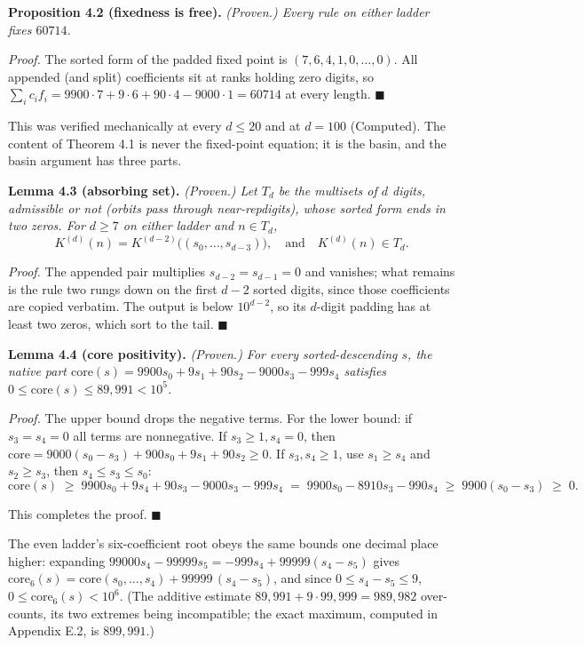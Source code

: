 \documentclass[11pt,letterpaper]{article}
\theoremstyle{paperstyle}
\theoremstyle{paperstyledef}
\theoremstyle{paperstylerem}
\begin{document}
\textbf{Proposition 4.2 (fixedness is free).} \emph{(Proven.) Every rule on either ladder fixes \(60714\).}

\emph{Proof.} The sorted form of the padded fixed point is \((7,6,4,1,0,\dots,0)\). All appended (and split) coefficients sit at ranks holding zero digits, so \(\sum_i c_i f_i = 9900\cdot 7 + 9 \cdot 6 + 90\cdot 4 - 9000 \cdot 1 = 60714\) at every length. \(\blacksquare\)

This was verified mechanically at every \(d \leq 20\) and at \(d = 100\) (Computed). The content of Theorem 4.1 is never the fixed-point equation; it is the basin, and the basin argument has three parts.

\textbf{Lemma 4.3 (absorbing set).} \emph{(Proven.) Let \(T_d\) be the multisets of \(d\) digits, admissible or not (orbits pass through near-repdigits), whose sorted form ends in two zeros. For \(d \geq 7\) on either ladder and \(n \in T_d\),} \[K^{(d)}(n) = K^{(d-2)}\bigl((s_0, \dots, s_{d-3})\bigr), \quad\text{and}\quad K^{(d)}(n) \in T_d.\]

\emph{Proof.} The appended pair multiplies \(s_{d-2} = s_{d-1} = 0\) and vanishes; what remains is the rule two rungs down on the first \(d-2\) sorted digits, since those coefficients are copied verbatim. The output is below \(10^{d-2}\), so its \(d\)-digit padding has at least two zeros, which sort to the tail. \(\blacksquare\)

\textbf{Lemma 4.4 (core positivity).} \emph{(Proven.) For every sorted-descending \(s\), the native part \(\mathrm{core}(s) = 9900 s_0 + 9 s_1 + 90 s_2 - 9000 s_3 - 999 s_4\) satisfies \(0 \leq \mathrm{core}(s) \leq 89{,}991 < 10^5\).}

\emph{Proof.} The upper bound drops the negative terms. For the lower bound: if \(s_3 = s_4 = 0\) all terms are nonnegative. If \(s_3 \geq 1, s_4 = 0\), then \(\mathrm{core} = 9000(s_0 - s_3) + 900 s_0 + 9 s_1 + 90 s_2 \geq 0\). If \(s_3, s_4 \geq 1\), use \(s_1 \geq s_4\) and \(s_2 \geq s_3\), then \(s_4 \leq s_3 \leq s_0\): \[\mathrm{core}(s) \;\geq\; 9900 s_0 + 9 s_4 + 90 s_3 - 9000 s_3 - 999 s_4 \;=\; 9900 s_0 - 8910 s_3 - 990 s_4 \;\geq\; 9900(s_0 - s_3) \;\geq\; 0.\]

This completes the proof. \(\blacksquare\)

The even ladder's six-coefficient root obeys the same bounds one decimal place higher: expanding \(99000 s_4 - 99999 s_5 = -999 s_4 + 99999(s_4 - s_5)\) gives \(\mathrm{core}_6(s) = \mathrm{core}(s_0, \dots, s_4) + 99999\,(s_4 - s_5)\), and since \(0 \leq s_4 - s_5 \leq 9\), \(0 \leq \mathrm{core}_6(s) < 10^6\). (The additive estimate \(89{,}991 + 9 \cdot 99{,}999 = 989{,}982\) over-counts, its two extremes being incompatible; the exact maximum, computed in Appendix E.2, is \(899{,}991\).)
\end{document}

